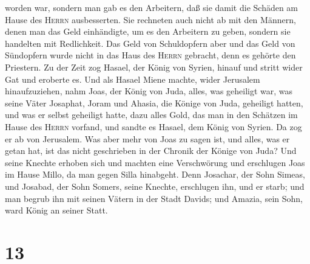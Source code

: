worden war,  sondern man gab es den Arbeitern, daß sie
damit die Schäden am Hause des \textsc{Herrn} ausbesserten.
 Sie rechneten auch nicht ab mit den Männern, denen man
das Geld einhändigte, um es den Arbeitern zu geben, sondern sie
handelten mit Redlichkeit.  Das Geld von Schuldopfern
aber und das Geld von Sündopfern wurde nicht in das Haus des
\textsc{Herrn} gebracht, denn es gehörte den Priestern. 
Zu der Zeit zog Hasael, der König von Syrien, hinauf und stritt wider
Gat und eroberte es. Und als Hasael Miene machte, wider Jerusalem
hinaufzuziehen,  nahm Joas, der König von Juda, alles,
was geheiligt war, was seine Väter Josaphat, Joram und Ahasia, die
Könige von Juda, geheiligt hatten, und was er selbst geheiligt hatte,
dazu alles Gold, das man in den Schätzen im Hause des \textsc{Herrn}
vorfand, und sandte es Hasael, dem König von Syrien. Da zog er ab von
Jerusalem.  Was aber mehr von Joas zu sagen ist, und
alles, was er getan hat, ist das nicht geschrieben in der Chronik der
Könige von Juda?  Und seine Knechte erhoben sich und
machten eine Verschwörung und erschlugen Joas im Hause Millo, da man
gegen Silla hinabgeht.  Denn Josachar, der Sohn Simeas,
und Josabad, der Sohn Somers, seine Knechte, erschlugen ihn, und er
starb; und man begrub ihn mit seinen Vätern in der Stadt Davids; und
Amazia, sein Sohn, ward König an seiner Statt.

\hypertarget{section-12}{%
\section{13}\label{section-12}}

